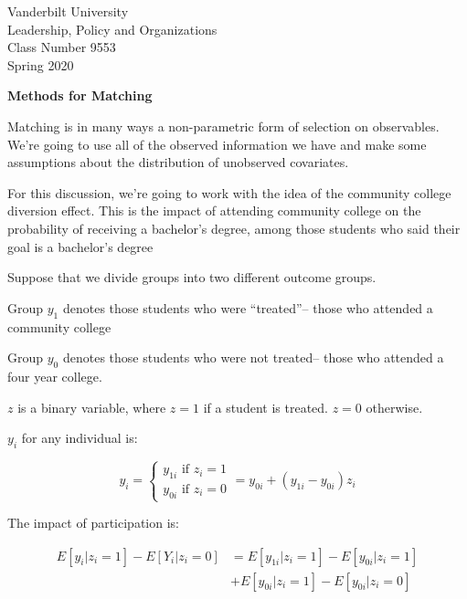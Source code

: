 \documentclass[12pt]{article}
\begin{document}
\thispagestyle{empty}%


\setmarginsrb{1in}{.5in}{.1in}{.5in}{0pt}{0mm}{0pt}{0mm}%

\setlength{\parskip}{1ex plus 0.5ex minus 0.2ex}

\setcounter{secnumdepth}{-2}



\begin{flushleft}
Vanderbilt University\\Leadership, Policy and Organizations\\Class Number 9553\\ Spring 2020
\end{flushleft}

\begin{center}
\textbf{Methods for Matching}
\end{center}


Matching is in many ways a non-parametric form of
selection on observables. We're going to use all of the observed
information we have and make some assumptions about the distribution
of unobserved covariates. 

For this discussion, we're going to work with the idea of the
community college diversion effect. This is the impact of attending
community college on the probability of receiving a bachelor's
degree, among those students who said their goal is a bachelor's degree

Suppose that we divide groups into two different outcome groups.

Group $y_1$ denotes those students who were ``treated''-- those who
attended a community college

Group $y_0$ denotes those students who were not treated-- those who
attended a four year college. 

$z$ is a binary variable, where $z=1$ if a student is treated. 
$z=0$ otherwise. 

$y_i$ for any individual is:

\begin{equation*}
  y_i=
\begin{cases}
  y_{1i} \text{ if } z_i=1 \\
y_{0i} \text{ if } z_i=0
\end{cases}=
y_{0i}+(y_{1i}-y_{0i})z_i
\end{equation*}

The impact of participation is:
 
\begin{align*}
  E[y_i|z_i=1]-E[Y_i|z_i=0]&=E[y_{1i}|z_i=1]-E[y_{0i}|z_i=1]\\
                           &+E[y_{0i}|z_i=1]-E[y_{0i}|z_i=0]
\end{align*}
\end{document}
